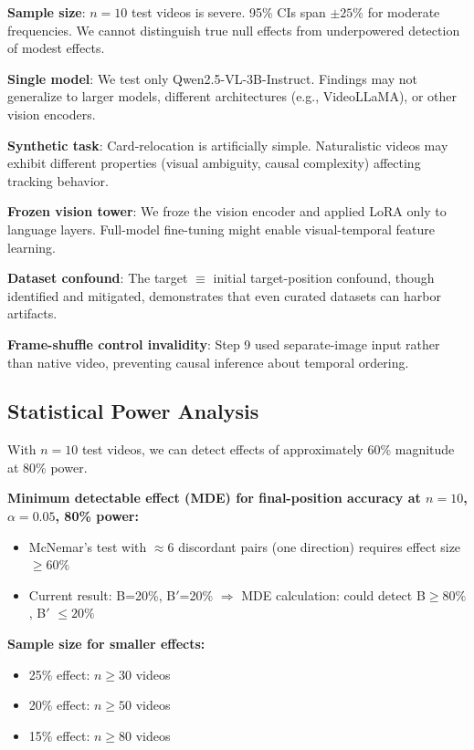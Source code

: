 \textbf{Sample size}: $n=10$ test videos is severe. 95\% CIs span $\pm 25$\% for moderate frequencies. We cannot distinguish true null effects from underpowered detection of modest effects.

\textbf{Single model}: We test only Qwen2.5-VL-3B-Instruct. Findings may not generalize to larger models, different architectures (e.g., VideoLLaMA), or other vision encoders.

\textbf{Synthetic task}: Card-relocation is artificially simple. Naturalistic videos may exhibit different properties (visual ambiguity, causal complexity) affecting tracking behavior.

\textbf{Frozen vision tower}: We froze the vision encoder and applied LoRA only to language layers. Full-model fine-tuning might enable visual-temporal feature learning.

\textbf{Dataset confound}: The target $\equiv$ initial target-position confound, though identified and mitigated, demonstrates that even curated datasets can harbor artifacts.

\textbf{Frame-shuffle control invalidity}: Step 9 used separate-image input rather than native video, preventing causal inference about temporal ordering.

\subsection{Statistical Power Analysis}

With $n=10$ test videos, we can detect effects of approximately 60\% magnitude at 80\% power.

\textbf{Minimum detectable effect (MDE) for final-position accuracy at $n=10$, $\alpha=0.05$, 80\% power:}
\begin{itemize}
    \item McNemar's test with $\approx 6$ discordant pairs (one direction) requires effect size $\geq 60\%$
    \item Current result: B=20\%, B$'$=20\% $\Rightarrow$ MDE calculation: could detect B$\geq 80\%$, B$'$ $\leq 20\%$
\end{itemize}

\textbf{Sample size for smaller effects:}
\begin{itemize}
    \item 25\% effect: $n \geq 30$ videos
    \item 20\% effect: $n \geq 50$ videos
    \item 15\% effect: $n \geq 80$ videos
\end{itemize}

